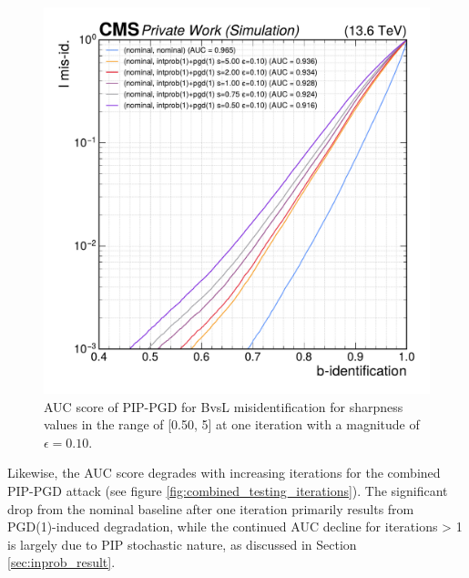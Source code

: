 \begin{figure}[h]
\centering
    \includegraphics[width=12cm]{media/output/roc_bvsl_combined_sharpness.pdf}
    \caption{AUC score of PIP-PGD for BvsL misidentification for sharpness values in the range of [0.50, 5] at one iteration with a magnitude of $\epsilon=0.10$.}
    \label{fig:combined_testing_sharpness}
\end{figure}

Likewise, the AUC score degrades with increasing iterations for the combined PIP-PGD attack (see figure \ref{fig:combined_testing_iterations}). The significant drop from the nominal baseline after one iteration primarily results from PGD(1)-induced degradation, while the continued AUC decline for iterations > 1 is largely due to PIP stochastic nature, as discussed in Section \ref{sec:inprob_result}.

